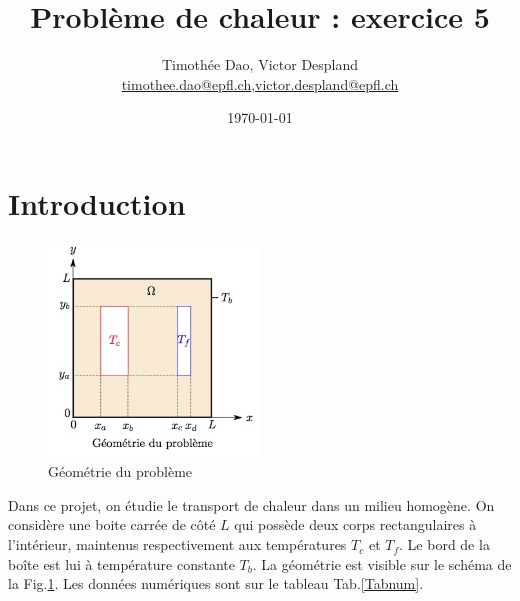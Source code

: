 \documentclass[a4paper,12pt,oneside]{article}
\newcommand{\mail}[1]{{\href{mailto:#1}{#1}}}
\begin{document}
\pagestyle{empty}

\title{Problème de chaleur : exercice 5}
\date{\today}
\author{Timothée Dao, Victor Despland\\{\small \mail{timothee.dao@epfl.ch},\mail{victor.despland@epfl.ch}}}
\maketitle
\thispagestyle{empty} %
 

\clearpage
\tableofcontents




\newpage 
\setcounter{page}{1}
\pagestyle{plain}

\section{Introduction}

\intextsep=-0.5cm
\begin{figure}
    \centering
    \includegraphics[width=0.5\textwidth]{EX5geom.jpeg}
    \caption{Géométrie du problème \cite{donneeEX5} \label{GeomduP}}
\end{figure}

Dans ce projet, on étudie le transport de chaleur dans un milieu homogène. On considère une boite carrée de côté $L$ qui possède deux corps rectangulaires à l'intérieur, maintenus respectivement aux températures $T_c$ et $T_f$. Le bord de la boîte est lui à température constante $T_b$. La géométrie est visible sur le schéma de la Fig.\ref{GeomduP}. 
Les données numériques sont sur le tableau Tab.\ref{Tabnum}.
\end{document}
